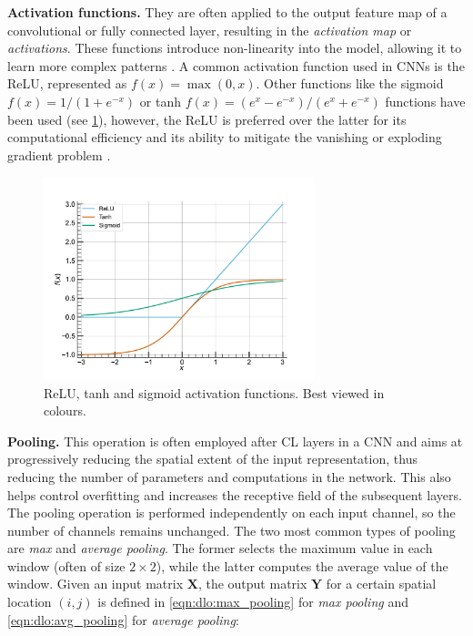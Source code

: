 \noindent \textbf{Activation functions.} They are often applied to the output
feature map of a convolutional or fully connected layer, resulting in the
\emph{activation map} or \emph{activations}. These functions introduce
non-linearity into the model, allowing it to learn more complex patterns
\cite{long2015fully}. A common activation function used in \acp{CNN} is the
\ac{ReLU}, represented as $f(x)=\max(0,x)$. Other functions like the sigmoid
$f(x)=1/(1+e^{-x})$ or tanh $f(x)=(e^{x} -e^{-x})/(e^{x}+e^{-x})$ functions have
been used (see \cref{fig:dlo:activation_functions}), however, the \ac{ReLU} is
preferred over the latter for its computational efficiency and its ability to
mitigate the vanishing or exploding gradient problem
\cite{hochreiter2001gradient,glorot2010understanding}.\\

\begin{figure}[htbp]
  \centering
  \includegraphics[width=0.7\textwidth]{chapter_dlo/assets/activation_functions.pdf}
  \caption{\ac{ReLU}, tanh and sigmoid activation functions. Best viewed in
  colours.}
  \label{fig:dlo:activation_functions}
\end{figure}

\noindent \textbf{Pooling.} This operation is often employed after \ac{CL}
layers in a \ac{CNN} and aims at progressively reducing the spatial extent of
the input representation, thus reducing the number of parameters and
computations in the network. This also helps control overfitting and increases
the receptive field of the subsequent layers. The pooling operation is performed
independently on each input channel, so the number of channels remains
unchanged. The two most common types of pooling are \emph{max} and \emph{average
pooling}. The former selects the maximum value in each window (often of size
$2\times 2$), while the latter computes the average value of the window. Given
an input matrix $\mathbf{X}$, the output matrix $ \mathbf{Y} $ for a certain
spatial location $(i, j)$ is defined in \cref{eqn:dlo:max_pooling} for \emph{max
pooling} and \cref{eqn:dlo:avg_pooling} for \emph{average pooling}:\\

